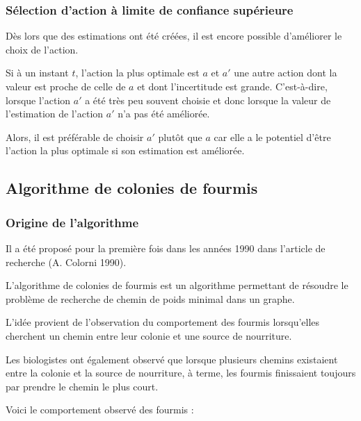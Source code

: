 \documentclass[
12pt,
french,
]{article}
\begin{document}
\hypertarget{suxe9lection-daction-uxe0-limite-de-confiance-supuxe9rieure}{%
\subsubsection{Sélection d'action à limite de confiance
supérieure}\label{suxe9lection-daction-uxe0-limite-de-confiance-supuxe9rieure}}

Dès lors que des estimations ont été créées, il est encore possible
d'améliorer le choix de l'action.

Si à un instant \(t\), l'action la plus optimale est \(a\) et \(a'\) une
autre action dont la valeur est proche de celle de \(a\) et dont
l'incertitude est grande. C'est-à-dire, lorsque l'action \(a'\) a été
très peu souvent choisie et donc lorsque la valeur de l'estimation de
l'action \(a'\) n'a pas été améliorée.

Alors, il est préférable de choisir \(a'\) plutôt que \(a\) car elle a
le potentiel d'être l'action la plus optimale si son estimation est
améliorée.

\hypertarget{algorithme-de-colonies-de-fourmis}{%
\subsection{Algorithme de colonies de
fourmis}\label{algorithme-de-colonies-de-fourmis}}

\hypertarget{origine-de-lalgorithme}{%
\subsubsection{Origine de l'algorithme}\label{origine-de-lalgorithme}}

Il a été proposé pour la première fois dans les années 1990 dans
l'article de recherche (A. Colorni 1990).

L'algorithme de colonies de fourmis est un algorithme permettant de
résoudre le problème de recherche de chemin de poids minimal dans un
graphe.

L'idée provient de l'observation du comportement des fourmis
lorsqu'elles cherchent un chemin entre leur colonie et une source de
nourriture.

Les biologistes ont également observé que lorsque plusieurs chemins
existaient entre la colonie et la source de nourriture, à terme, les
fourmis finissaient toujours par prendre le chemin le plus court.

Voici le comportement observé des fourmis :
\end{document}
